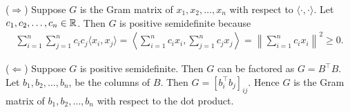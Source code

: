 (\(\Rightarrow\))
Suppose \(G\) is the Gram matrix of \(x_1, x_2, \dots, x_n\) with respect to \(\langle \cdot, \cdot \rangle\).
Let \(c_1, c_2, \dots, c_n \in \mathbb{R}\).
Then \(G\) is positive semidefinite because
\begin{align}
    \sum_{i=1}^{n} \sum_{j=1}^{n} c_i c_j \langle x_i, x_j \rangle
    = \left\langle
        \sum_{i=1}^{n} c_i x_i, \sum_{j=1}^{n} c_j x_j
    \right\rangle
    = \left\|
        \sum_{i=1}^{n} c_i x_i
    \right\|^2
    \geq 0.
\end{align}

(\(\Leftarrow\))
Suppose \(G\) is positive semidefinite.
Then \(G\) can be factored as \(G = B^\top B\).
Let \(b_1, b_2, \dots, b_n\), be the columns of \(B\).
Then \(G = [b_i^\top b_j]_{ij}\).
Hence \(G\) is the Gram matrix of \(b_1, b_2, \dots, b_n\) with respect to the dot product.